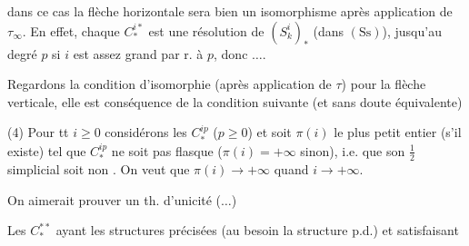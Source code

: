dans ce cas la flèche horizontale sera bien un isomorphisme  après application de $\tau_\infty$. En effet, chaque $C_*^{i*}$ est une résolution de $(S_k^i)_*$ (dans $(\mathrm{Ss})$), jusqu'au degré $p$ si $i$ est assez grand par r. à $p$, donc $\ldots$.

 Regardons la condition d'isomorphie (après application de $\tau$) pour la flèche verticale, elle  est conséquence de la condition suivante (et sans doute équivalente)

(4) Pour tt $i\geq0$ considérons les  $C_*^{ip}$ ($p\geq0$) et soit $\pi(i)$ le plus petit entier (s'il existe) tel que $C_*^{ip}$ ne soit pas flasque ($\pi(i)=+\infty$ sinon),  i.e. que son \uline{} $\frac12$ simplicial  soit non . On veut que $\pi(i)\longrightarrow+\infty$ quand $i\longrightarrow+\infty$.
\begin{center}
\end{center}
On aimerait prouver un th. d'unicité ($\ldots$)

Les $C_*^{**}$ ayant les structures précisées (au besoin  la structure p.d.) et satisfaisant
